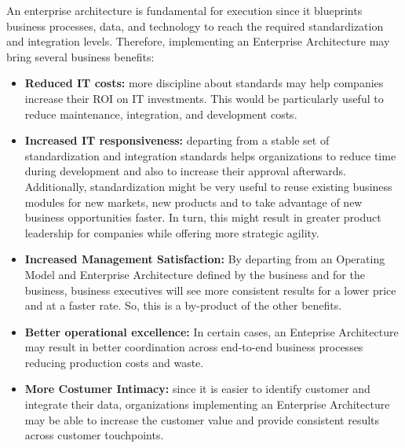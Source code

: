 %
%
An enterprise architecture is fundamental for execution since it blueprints business processes, data, and
technology to reach the required standardization and integration levels.
Therefore, implementing an Enterprise Architecture may bring several business benefits:

\begin{itemize}
    \item \textbf{Reduced IT costs:} more discipline about standards may help companies increase their
          ROI on IT investments.
          This would be particularly useful to reduce maintenance, integration, and development costs.
    \item \textbf{Increased IT responsiveness:} departing from a stable set of standardization and integration standards
          helps organizations to reduce time during development and also to increase their approval afterwards.
          Additionally, standardization might be very useful to reuse existing business modules for new markets,
          new products and to take advantage of new business opportunities faster.
          In turn, this might result in greater product leadership for companies while offering more strategic agility.
    \item \textbf{Increased Management Satisfaction:} By departing from an Operating Model and Enterprise Architecture
          defined by the business and for the business, business executives will see more consistent results
          for a lower price and at a faster rate.
          So, this is a by-product of the other benefits.
    \item \textbf{Better operational excellence:} In certain cases, an Enteprise Architecture may result in better
          coordination across end-to-end business processes reducing production costs and waste.
    \item \textbf{More Costumer Intimacy:} since it is easier to identify customer and integrate their data,
          organizations implementing an Enterprise Architecture may be able to increase the customer value
          and provide consistent results across customer touchpoints.
\end{itemize}

